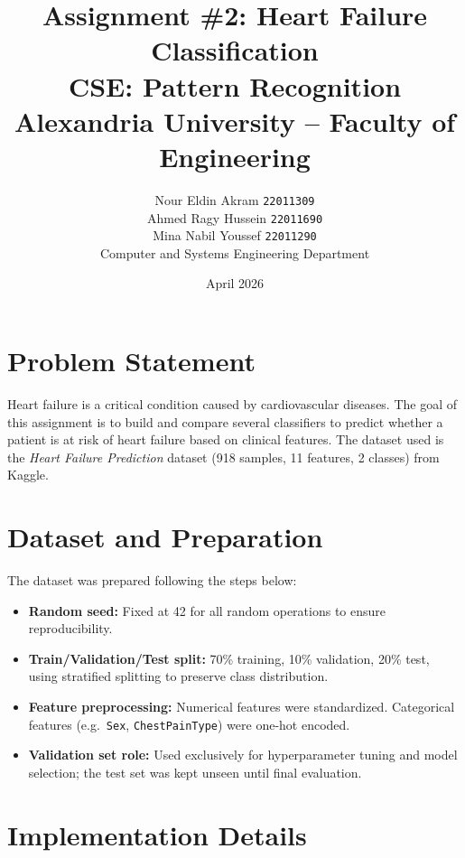 \documentclass[12pt,a4paper]{article}
\title{\textbf{Assignment \#2: Heart Failure Classification}\\
\large CSE: Pattern Recognition\\
Alexandria University -- Faculty of Engineering}
\author{
  Nour Eldin Akram  	\quad \texttt{22011309} \\
  Ahmed Ragy Hussein	 \quad \texttt{22011690} \\
  Mina Nabil Youssef	 \quad \texttt{22011290} \\[6pt]
  \normalsize Computer and Systems Engineering Department
}
\date{April 2026}
\begin{document}
\maketitle
\tableofcontents
\newpage

\section{Problem Statement}

Heart failure is a critical condition caused by cardiovascular diseases. The goal of this
assignment is to build and compare several classifiers to predict whether a patient is at
risk of heart failure based on clinical features. The dataset used is the
\textit{Heart Failure Prediction} dataset (918 samples, 11 features, 2 classes) from Kaggle.

\section{Dataset and Preparation}

The dataset was prepared following the steps below:

\begin{itemize}
  \item \textbf{Random seed:} Fixed at 42 for all random operations to ensure reproducibility.
  \item \textbf{Train/Validation/Test split:} 70\% training, 10\% validation, 20\% test,
        using stratified splitting to preserve class distribution.
  \item \textbf{Feature preprocessing:} Numerical features were standardized.
        Categorical features (e.g.\ \texttt{Sex}, \texttt{ChestPainType}) were one-hot encoded.
  \item \textbf{Validation set role:} Used exclusively for hyperparameter tuning and model
        selection; the test set was kept unseen until final evaluation.
\end{itemize}

\section{Implementation Details}
\end{document}
